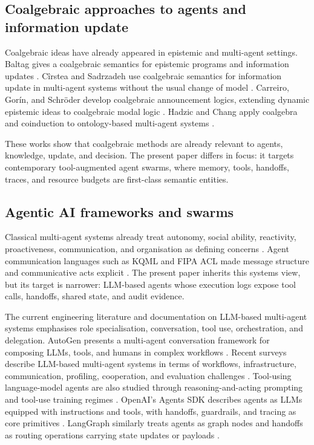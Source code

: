 \documentclass[a4paper,fleqn]{cas-sc}
\begin{document}
\subsection{Coalgebraic approaches to agents and information update}

Coalgebraic ideas have already appeared in epistemic and multi-agent settings. Baltag gives a coalgebraic semantics for epistemic programs and information updates \cite{baltag2003}. Cîrstea and Sadrzadeh use coalgebraic semantics for information update in multi-agent systems without the usual change of model \cite{cirstea2007}. Carreiro, Gorín, and Schröder develop coalgebraic announcement logics, extending dynamic epistemic ideas to coalgebraic modal logic \cite{carreiro2013}. Hadzic and Chang apply coalgebra and coinduction to ontology-based multi-agent systems \cite{hadzic2008}.

These works show that coalgebraic methods are already relevant to agents, knowledge, update, and decision. The present paper differs in focus: it targets contemporary tool-augmented agent swarms, where memory, tools, handoffs, traces, and resource budgets are first-class semantic entities.

\subsection{Agentic AI frameworks and swarms}

Classical multi-agent systems already treat autonomy, social ability, reactivity, proactiveness, communication, and organisation as defining concerns \cite{wooldridge1995,shoham1993,rao1995,cohen1990,wooldridge2009}. Agent communication languages such as KQML and FIPA ACL made message structure and communicative acts explicit \cite{finin1994,fipa2002}. The present paper inherits this systems view, but its target is narrower: LLM-based agents whose execution logs expose tool calls, handoffs, shared state, and audit evidence.

The current engineering literature and documentation on LLM-based multi-agent systems emphasises role specialisation, conversation, tool use, orchestration, and delegation. AutoGen presents a multi-agent conversation framework for composing LLMs, tools, and humans in complex workflows \cite{wu2024autogen}. Recent surveys describe LLM-based multi-agent systems in terms of workflows, infrastructure, communication, profiling, cooperation, and evaluation challenges \cite{li2024survey,guo2024survey}. Tool-using language-model agents are also studied through reasoning-and-acting prompting and tool-use training regimes \cite{yao2023react,schick2023toolformer}. OpenAI's Agents SDK describes agents as LLMs equipped with instructions and tools, with handoffs, guardrails, and tracing as core primitives \cite{openai2026agents}. LangGraph similarly treats agents as graph nodes and handoffs as routing operations carrying state updates or payloads \cite{langgraph2026handoffs}.
\end{document}
